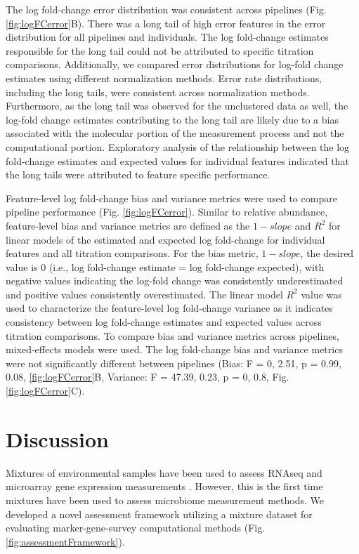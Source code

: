 \documentclass{bmcart}
\begin{document}
The log fold-change error distribution was consistent across pipelines
(Fig. \ref{fig:logFCerror}B). There was a long tail of high error
features in the error distribution for all pipelines and individuals.
The log fold-change estimates responsible for the long tail could not be
attributed to specific titration comparisons. Additionally, we compared
error distributions for log-fold change estimates using
different normalization methods. Error rate distributions, including the
long tails, were consistent across normalization methods. Furthermore,
as the long tail was observed for the unclustered data as well, the
log-fold change estimates contributing to the long tail are likely due
to a bias associated with the molecular portion of the
measurement process and not the computational portion. Exploratory
analysis of the relationship between the log fold-change estimates and
expected values for individual features indicated that the long tails
were attributed to feature specific performance.

Feature-level log fold-change bias and variance metrics were used to
compare pipeline performance (Fig. \ref{fig:logFCerror}). Similar to
relative abundance, feature-level bias and variance metrics are defined
as the \(1 - slope\) and \(R^2\) for linear models of the estimated and
expected log fold-change for individual features and all titration
comparisons. For the bias metric, \(1 - slope\), the desired value is 0
(i.e., log fold-change estimate = log fold-change expected), with
negative values indicating the log-fold change was consistently
underestimated and positive values consistently overestimated. The
linear model \(R^2\) value was used to characterize the feature-level
log fold-change variance as it indicates consistency between log
fold-change estimates and expected values across titration comparisons.
To compare bias and variance metrics across pipelines, mixed-effects
models were used. The log fold-change bias and variance metrics were not
significantly different between pipelines (Bias: F = 0, 2.51, p = 0.99,
0.08, \ref{fig:logFCerror}B, Variance: F = 47.39, 0.23, p = 0, 0.8, Fig.
\ref{fig:logFCerror}C).


\section*{Discussion}
Mixtures of environmental samples have been used to assess
RNAseq and microarray gene expression measurements \cite{parsons2015using, pine2011adaptable, thompson2005use}.
However, this is the first time mixtures have been used to assess microbiome measurement
methods. We developed a novel assessment framework utilizing a mixture dataset
for evaluating marker-gene-survey computational methods (Fig. \ref{fig:assessmentFramework}).
\end{document}
